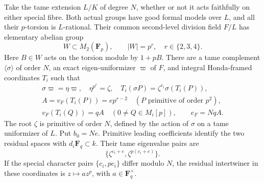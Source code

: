 \begin{lemma}
\label{lem:B-RD67-normalization}
Take the tame extension \(L/K\) of degree \(N\), whether or not
it acts faithfully on either special fibre. Both actual groups
have good formal models over \(L\), and all their \(p\)-torsion
is \(L\)-rational. Their common second-level division field \(F/L\)
has elementary abelian group
\[
 W\subset M_2(\mathbf F_p),\qquad |W|=p^r,\quad r\in\{2,3,4\}.
 \tag{B-RD67.1}
\]
Here \(B\in W\) acts on the torsion module by \(1+pB\).
There are a tame complement \(\langle\sigma\rangle\) of order \(N\),
an exact eigen-uniformizer \(\varpi\) of \(F\), and integral
Honda-framed coordinates \(T_i\) such that
\[
 \begin{gathered}
 \sigma\varpi=\eta\varpi,\quad \eta^{p^r}=\zeta,\quad
 T_i(\sigma P)=\zeta^{c_i}\sigma(T_i(P)),\\
 A=v_F(T_i(P))=e p^{r-2}\quad(P\text{ primitive of order }p^2),\\
 v_F(T_i(Q))=qA\quad(0\ne Q\in M_i[p]),\qquad
 e_F=NqA .
 \end{gathered}
 \tag{B-RD67.2}
\]
The root \(\zeta\) is primitive of order \(N\), defined by the action
of \(\sigma\) on a tame uniformizer of \(L\). Put \(b_0=Ne\).
Primitive leading coefficients identify the two residual spaces
with \(d_i\mathbf F_q\subset k\). Their tame eigenvalue pairs are
\[
 \{\zeta^{c_i+e},\zeta^{p(c_i+e)}\}.
 \tag{B-RD67.3}
\]
If the special character pairs \(\{c_i,pc_i\}\) differ modulo \(N\),
the residual intertwiner in these coordinates is
\(z\mapsto a z^p\), with \(a\in\mathbf F_q^\times\).
\end{lemma}
